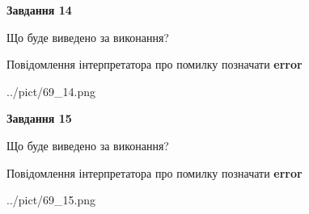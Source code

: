 \documentclass[11pt, ukrainian]{article}
\begin{document}
{\begin {large}
{\begin {center}\textbf{Завдання 14}\end {center}}\par
Що буде виведено за виконання? \par
Повідомлення інтерпретатора про помилку позначати \textbf{error}

\begin{center}
	{../pict/69_14.png}
\end{center}
\newpage

{\begin {center}\textbf{Завдання 15}\end {center}}\par
Що буде виведено за виконання? \par
Повідомлення інтерпретатора про помилку позначати \textbf{error}

\begin{center}
	{../pict/69_15.png}
\end{center}
\newpage

\end {large}}
\end{document}
